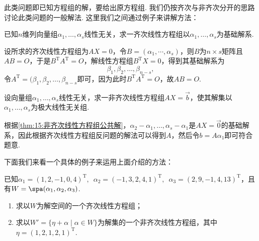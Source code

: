 此类问题即已知方程组的解，要给出原方程组. 我们仍按齐次与非齐次分开的思路讨论此类问题的一般解法. 这里我们之间通过例子来讲解方法：
\begin{example}
    已知$n$维列向量组$\alpha_1,\ldots,\alpha_s$线性无关，求一齐次线性方程组以$\alpha_1,\ldots,\alpha_s$为基础解系.
\end{example}

\begin{solution}
    设所求的齐次线性方程组为$AX=0$，令$B=(\alpha_1,\cdots,\alpha_s)$，则$B$为$n\times s$矩阵且$AB=O$，于是$B^\mathrm{T}A^\mathrm{T}=O$，解线性方程组$B^\mathrm{T}X=0$，得到其基础解系为
    \[\beta_1,\beta_2,\ldots,\beta_{n-s},\]
    令$A^\mathrm{T}=(\beta_1,\beta_2,\ldots,\beta_{n-s}$即可，因为此时$B^\mathrm{T}A^\mathrm{T}=O$，故$AB=O$.
\end{solution}

\begin{example}
    设向量组$\alpha_1,\ldots,\alpha_s$线性无关，求一非齐次线性方程组$AX=\vec{b}$，使其解集以$\alpha_1,\ldots,\alpha_s$为极大线性无关组.
\end{example}

\begin{solution}
    根据\autoref{thm:15:非齐次线性方程组公共解}，$\alpha_2-\alpha_1,\ldots,\alpha_s-\alpha_1$是$AX=\vec{0}$的基础解系，因此根据齐次线性方程组反问题的解法可以得到$A$，然后令$b=A\alpha_1$即可符合题意.
\end{solution}

下面我们来看一个具体的例子来运用上面介绍的方法：
\begin{example}
    已知$\alpha_1=(1,2,-1,0,4)^\mathrm{T},\enspace\alpha_2=(-1,3,2,4,1)^\mathrm{T},\enspace\alpha_3=(2,9,-1,4,13)^\mathrm{T}$，且有$W=\spa(\alpha_1,\alpha_2,\alpha_3)$.
    \begin{enumerate}
        \item 求以$W$为解空间的一个齐次线性方程组；

        \item 求以$W'=\{\eta+\alpha \mid \alpha\in W\}$为解集的一个非齐次线性方程组，其中$\eta=(1,2,1,2,1)^\mathrm{T}$.
    \end{enumerate}
\end{example}

